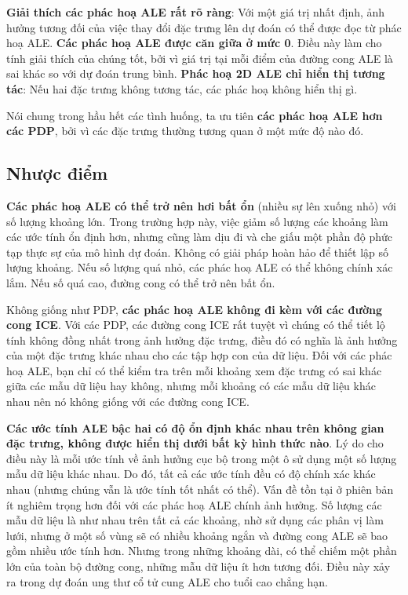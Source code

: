 \textbf{Giải thích các phác hoạ ALE rất rõ ràng}: Với một giá trị nhất định, ảnh hưởng tương đối của việc thay đổi đặc trưng lên dự đoán có thể được đọc từ phác hoạ ALE. \textbf{Các phác hoạ ALE được căn giữa ở mức 0}. Điều này làm cho tính giải thích của chúng tốt, bởi vì giá trị tại mỗi điểm của đường cong ALE là sai khác so với dự đoán trung bình. \textbf{Phác hoạ 2D ALE chỉ hiển thị tương tác}: Nếu hai đặc trưng không tương tác, các phác hoạ không hiển thị gì.

Nói chung trong hầu hết các tình huống, ta ưu tiên \textbf{các phác hoạ ALE hơn các PDP}, bởi vì các đặc trưng thường tương quan ở một mức độ nào đó.


\subsection{Nhược điểm}
\textbf{Các phác hoạ ALE có thể trở nên hơi bất ổn} (nhiều sự lên xuống nhỏ) với số lượng khoảng lớn. Trong trường hợp này, việc giảm số lượng các khoảng làm các ước tính ổn định hơn, nhưng cũng làm dịu đi và che giấu một phần độ phức tạp thực sự của mô hình dự đoán. Không có giải pháp hoàn hảo để thiết lập số lượng khoảng. Nếu số lượng quá nhỏ, các phác hoạ ALE có thể không chính xác lắm. Nếu số quá cao, đường cong có thể trở nên bất ổn.

Không giống như PDP, \textbf{các phác hoạ ALE không đi kèm với các đường cong ICE}. Với các PDP, các đường cong ICE rất tuyệt vì chúng có thể tiết lộ tính không đồng nhất trong ảnh hưởng đặc trưng, điều đó có nghĩa là ảnh hưởng của một đặc trưng khác nhau cho các tập hợp con của dữ liệu. Đối với các phác hoạ ALE, bạn chỉ có thể kiểm tra trên mỗi khoảng xem đặc trưng có sai khác giữa các mẫu dữ liệu hay không, nhưng mỗi khoảng có các mẫu dữ liệu khác nhau nên nó không giống với các đường cong ICE.

\textbf{Các ước tính ALE bậc hai có độ ổn định khác nhau trên không gian đặc trưng, không được hiển thị dưới bất kỳ hình thức nào}. Lý do cho điều này là mỗi ước tính về ảnh hưởng cục bộ trong một ô sử dụng một số lượng mẫu dữ liệu khác nhau. Do đó, tất cả các ước tính đều có độ chính xác khác nhau (nhưng chúng vẫn là ước tính tốt nhất có thể). Vấn đề tồn tại ở phiên bản ít nghiêm trọng hơn đối với các phác hoạ ALE chính ảnh hưởng. Số lượng các mẫu dữ liệu là như nhau trên tất cả các khoảng, nhờ sử dụng các phân vị làm lưới, nhưng ở một số vùng sẽ có nhiều khoảng ngắn và đường cong ALE sẽ bao gồm nhiều ước tính hơn. Nhưng trong những khoảng dài, có thể chiếm một phần lớn của toàn bộ đường cong, những mẫu dữ liệu ít hơn tương đối. Điều này xảy ra trong dự đoán ung thư cổ tử cung ALE cho tuổi cao chẳng hạn.

